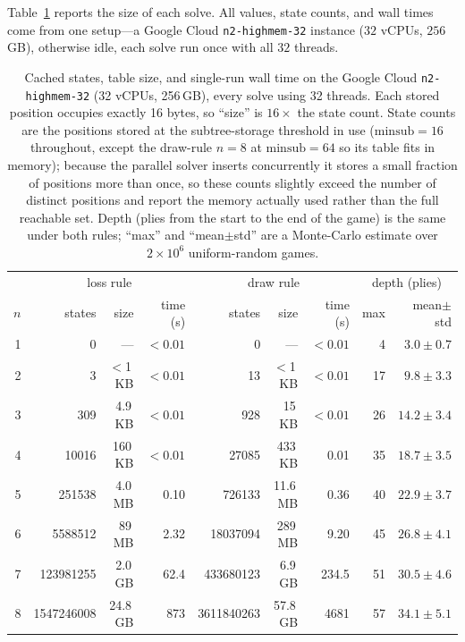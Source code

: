 \documentclass[11pt]{article}
\theoremstyle{plain}
\theoremstyle{definition}
\newcommand{\nEightLossStates}{\num{1547246008}}
\newcommand{\drawEightStates}{\num{3611840263}}
\newcommand{\drawEightSize}{57.8\,GB}
\newcommand{\drawEightTime}{4681}
\begin{document}
Table~\ref{tab:scale} reports the size of each solve. All values, state counts, and
wall times come from one setup---a Google Cloud \texttt{n2-highmem-32} instance
($32$ vCPUs, $256$\,GB), otherwise idle, each solve run once with all $32$ threads.

\begin{table}[t]
\centering
\begin{tabular}{r r r r r r r r r}
\toprule
 & \multicolumn{3}{c}{loss rule} & \multicolumn{3}{c}{draw rule} & \multicolumn{2}{c}{depth (plies)} \\
\cmidrule(lr){2-4}\cmidrule(lr){5-7}\cmidrule(lr){8-9}
$n$ & states & size & time (s) & states & size & time (s) & max & mean$\pm$std \\
\midrule
1 & 0 & --- & $<0.01$ & 0 & --- & $<0.01$ & 4 & $3.0\pm0.7$ \\
2 & 3 & $<$1\,KB & $<0.01$ & 13 & $<$1\,KB & $<0.01$ & 17 & $9.8\pm3.3$ \\
3 & 309 & 4.9\,KB & $<0.01$ & 928 & 15\,KB & $<0.01$ & 26 & $14.2\pm3.4$ \\
4 & \num{10016} & 160\,KB & $<0.01$ & \num{27085} & 433\,KB & 0.01 & 35 & $18.7\pm3.5$ \\
5 & \num{251538} & 4.0\,MB & 0.10 & \num{726133} & 11.6\,MB & 0.36 & 40 & $22.9\pm3.7$ \\
6 & \num{5588512} & 89\,MB & 2.32 & \num{18037094} & 289\,MB & 9.20 & 45 & $26.8\pm4.1$ \\
7 & \num{123981255} & 2.0\,GB & 62.4 & \num{433680123} & 6.9\,GB & 234.5 & 51 & $30.5\pm4.6$ \\
8 & \nEightLossStates & 24.8\,GB & 873 & \drawEightStates & \drawEightSize & \drawEightTime & 57 & $34.1\pm5.1$ \\
\bottomrule
\end{tabular}
\caption{Cached states, table size, and single-run wall time on the Google Cloud
\texttt{n2-highmem-32} (32 vCPUs, 256\,GB), every solve using 32 threads. Each
stored position occupies exactly 16 bytes, so ``size'' is $16\times$ the state
count. State counts are the positions stored at the subtree-storage threshold in
use ($\text{minsub}=16$ throughout, except the draw-rule $n=8$ at $\text{minsub}=64$
so its table fits in memory); because the parallel solver inserts concurrently it
stores a small fraction of positions more than once, so these counts slightly
exceed the number of distinct positions and report the memory actually used rather
than the full reachable set. Depth (plies from the start to the end of the game) is
the same under both rules; ``max'' and ``mean$\pm$std'' are a Monte-Carlo estimate
over $2\times10^{6}$ uniform-random games.}
\label{tab:scale}
\end{table}
\end{document}

